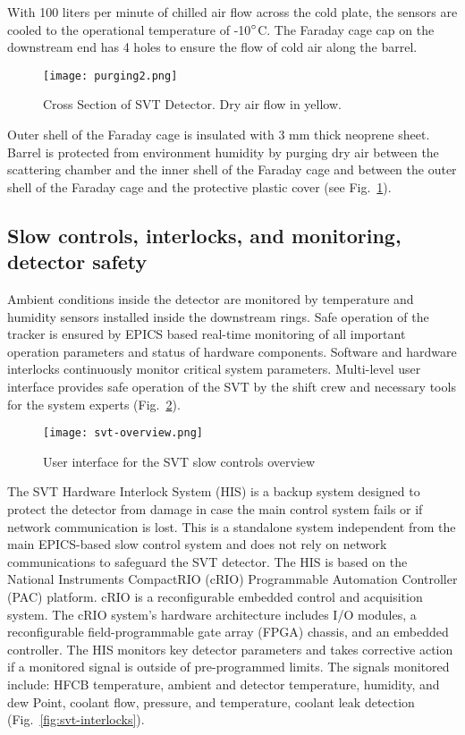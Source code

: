 With 100 liters per minute of chilled air flow across the cold plate, the sensors are cooled to the operational temperature of -10$\degree$C. The Faraday cage cap on the downstream end has 4 holes to ensure the flow of cold air along the barrel. 

\begin{figure}[hbt] 
\centering 
\texttt{[image: purging2.png]}
\caption{Cross Section of SVT Detector.  Dry air flow in yellow.}
\label{fig:purging2}
\end{figure}

Outer shell of the Faraday cage is insulated with 3 mm thick neoprene sheet. Barrel is protected from environment humidity by purging dry air between the scattering chamber and the inner shell of the Faraday cage and between the outer shell of the Faraday cage and the protective plastic cover (see Fig.~\ref{fig:purging2}). 

\subsection{Slow controls, interlocks, and monitoring, detector safety}

Ambient conditions inside the detector are monitored by temperature and humidity sensors installed inside the downstream rings. Safe operation of the tracker is ensured by EPICS based real-time monitoring of all important operation parameters and status of hardware components. Software and hardware interlocks continuously monitor critical system parameters. Multi-level user interface provides safe operation of the SVT by the shift crew and necessary tools for the system experts (Fig.~\ref{fig:svt-overview}).

\begin{figure}[hbt] 
\centering 
\texttt{[image: svt-overview.png]}
\caption{User interface for the SVT slow controls overview}
\label{fig:svt-overview}
\end{figure}

The SVT Hardware Interlock System (HIS) is a backup system designed to protect the detector from damage in case the main control system fails or if network communication is lost. This is a standalone system independent from the main EPICS-based slow control system and does not rely on network communications to safeguard the SVT detector. The HIS is based on the National Instruments CompactRIO (cRIO) Programmable Automation Controller (PAC) platform. cRIO is a reconfigurable embedded control and acquisition system. The cRIO system's hardware architecture includes I/O modules, a reconfigurable field-programmable gate array (FPGA) chassis, and an embedded controller. The HIS monitors key detector parameters and takes corrective action if a monitored signal is outside of pre-programmed limits. The signals monitored include: HFCB temperature, ambient and detector temperature, humidity, and dew Point, coolant flow, pressure, and temperature, coolant leak detection (Fig.~\ref{fig:svt-interlocks}). 

